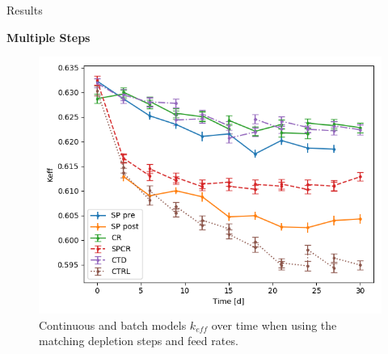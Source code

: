 \documentclass[final]{beamer}
\newlength{\onecolwid}
\newlength{\threecolwid}
\begin{document}
\begin{frame}[t]
\begin{columns}[t,totalwidth=\threecolwid]
\begin{column}{\onecolwid}
\begin{block}{Results}




\textbf{Multiple Steps}
\begin{figure}
	\label{fig:keff_30d_batch}
	\includegraphics[width=0.9\linewidth]{images/cumulative_keff_batch.png}
	\caption{Continuous and batch models $k_{eff}$ over time when using the matching depletion steps and feed rates.}
\end{figure}


\end{block}
\end{column}
\end{columns}
\end{frame}
\end{document}
